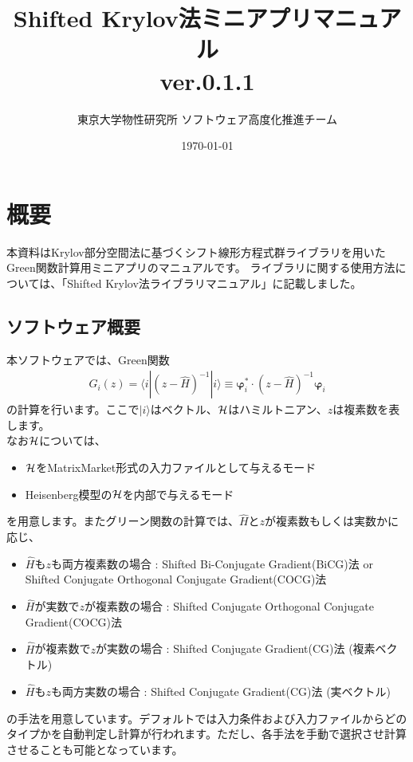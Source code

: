 \documentclass[12pt,titlepage]{jarticle}
\begin{document}
%
%
\title{Shifted Krylov法ミニアプリマニュアル \\
  ver.0.1.1}
\author{東京大学物性研究所 ソフトウェア高度化推進チーム}
\date{\today}
\maketitle
%

%
%
\tableofcontents

\newpage
\section{概要}

本資料はKrylov部分空間法に基づくシフト線形方程式群ライブラリを用いた
Green関数計算用ミニアプリのマニュアルです。
ライブラリに関する使用方法については、「Shifted Krylov法ライブラリマニュアル」に記載しました。

\subsection{ソフトウェア概要}
本ソフトウェアでは、Green関数
\begin{align}
  G_{i}(z) = \langle i | (z-{\hat H})^{-1}| i \rangle \equiv 
  {\boldsymbol \varphi}_i^{*} \cdot (z-{\hat H})^{-1} {\boldsymbol \varphi}_i
\end{align}
の計算を行います。ここで$| i \rangle $はベクトル、${\cal H}$はハミルトニアン、$z$は複素数を表します。\\
なお${\cal H}$については、
\begin{itemize}
\item{${\cal H}$をMatrixMarket形式の入力ファイルとして与えるモード}
\item{Heisenberg模型の${\cal H}$を内部で与えるモード}
\end{itemize}
を用意します。またグリーン関数の計算では、${\hat H}$と$z$が複素数もしくは実数かに応じ、
\begin{itemize}
\item ${\hat H}$も$z$も両方複素数の場合 : Shifted Bi-Conjugate Gradient(BiCG)法 or Shifted Conjugate Orthogonal Conjugate Gradient(COCG)法 
\item ${\hat H}$が実数で$z$が複素数の場合 : Shifted Conjugate Orthogonal Conjugate Gradient(COCG)法 
\item ${\hat H}$が複素数で$z$が実数の場合 : Shifted Conjugate Gradient(CG)法 (複素ベクトル)
\item ${\hat H}$も$z$も両方実数の場合 : Shifted Conjugate Gradient(CG)法 (実ベクトル)
\end{itemize}
の手法を用意しています。デフォルトでは入力条件および入力ファイルからどのタイプかを自動判定し計算が行われます。ただし、各手法を手動で選択させ計算させることも可能となっています。
\end{document}
